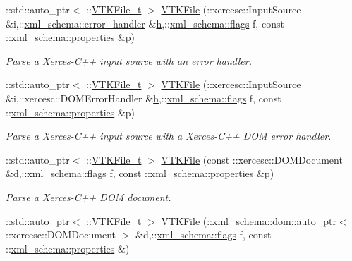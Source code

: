 \begin{DoxyCompactItemize}
\-::std\-::auto\-\_\-ptr$<$ \-::\hyperlink{classVTKFile__t}{V\-T\-K\-File\-\_\-t} $>$ \hyperlink{vtk-unstructured_8cpp_adf4d4d420188c2ec3cf7ecf194c0db9a}{V\-T\-K\-File} (\-::xercesc\-::\-Input\-Source \&i,\-::\hyperlink{namespacexml__schema_a0a5d9528e9175cedf199984a8bb64d62}{xml\-\_\-schema\-::error\-\_\-handler} \&\hyperlink{MolSim_8cpp_aa6e8e201edf24007dc075bfef6e8210c}{h},\-::\hyperlink{namespacexml__schema_a0612287d030cb2732d31a45b258fdc87}{xml\-\_\-schema\-::flags} f, const \-::\hyperlink{namespacexml__schema_a1a8ebac679580b41baebd62c7d641c1d}{xml\-\_\-schema\-::properties} \&p)
\begin{DoxyCompactList}\small\item\em Parse a Xerces-\/\-C++ input source with an error handler. \end{DoxyCompactList}\item 
\-::std\-::auto\-\_\-ptr$<$ \-::\hyperlink{classVTKFile__t}{V\-T\-K\-File\-\_\-t} $>$ \hyperlink{vtk-unstructured_8cpp_a05320585fc9be971c331447b76c0d14b}{V\-T\-K\-File} (\-::xercesc\-::\-Input\-Source \&i,\-::xercesc\-::\-D\-O\-M\-Error\-Handler \&\hyperlink{MolSim_8cpp_aa6e8e201edf24007dc075bfef6e8210c}{h},\-::\hyperlink{namespacexml__schema_a0612287d030cb2732d31a45b258fdc87}{xml\-\_\-schema\-::flags} f, const \-::\hyperlink{namespacexml__schema_a1a8ebac679580b41baebd62c7d641c1d}{xml\-\_\-schema\-::properties} \&p)
\begin{DoxyCompactList}\small\item\em Parse a Xerces-\/\-C++ input source with a Xerces-\/\-C++ D\-O\-M error handler. \end{DoxyCompactList}\item 
\-::std\-::auto\-\_\-ptr$<$ \-::\hyperlink{classVTKFile__t}{V\-T\-K\-File\-\_\-t} $>$ \hyperlink{vtk-unstructured_8cpp_a5cfc26d05bba2c6e23c17478e8178ddb}{V\-T\-K\-File} (const \-::xercesc\-::\-D\-O\-M\-Document \&d,\-::\hyperlink{namespacexml__schema_a0612287d030cb2732d31a45b258fdc87}{xml\-\_\-schema\-::flags} f, const \-::\hyperlink{namespacexml__schema_a1a8ebac679580b41baebd62c7d641c1d}{xml\-\_\-schema\-::properties} \&p)
\begin{DoxyCompactList}\small\item\em Parse a Xerces-\/\-C++ D\-O\-M document. \end{DoxyCompactList}\item 
\-::std\-::auto\-\_\-ptr$<$ \-::\hyperlink{classVTKFile__t}{V\-T\-K\-File\-\_\-t} $>$ \hyperlink{vtk-unstructured_8cpp_a47eb5ec0aafb0ac2a5cd332db8f6a8af}{V\-T\-K\-File} (\-::xml\-\_\-schema\-::dom\-::auto\-\_\-ptr$<$ \-::xercesc\-::\-D\-O\-M\-Document $>$ \&d,\-::\hyperlink{namespacexml__schema_a0612287d030cb2732d31a45b258fdc87}{xml\-\_\-schema\-::flags} f, const \-::\hyperlink{namespacexml__schema_a1a8ebac679580b41baebd62c7d641c1d}{xml\-\_\-schema\-::properties} \&)

\end{DoxyCompactItemize}
